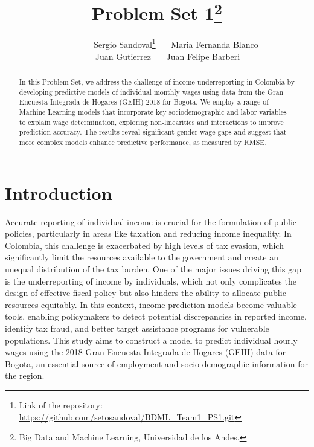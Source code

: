 \documentclass[11pt,a4paper,onecolumn]{article}
\begin{document}
\title{\huge Problem Set 1\thanks{Big Data and Machine Learning, Universidad de los Andes.}}

\author{\ \ \ \ \ \ \ \ \  Sergio Sandoval\thanks{Link of the repository: \href{https://github.com/setosandoval/BDML_Team1_PS1.git}{https://github.com/setosandoval/BDML\_Team1\_PS1.git}
} \ \ \ Maria Fernanda Blanco  

        \ \ \ \ \ Juan Gutierrez \ \ \ Juan Felipe Barberi}


\maketitle
\thispagestyle{empty} %

\begin{abstract}
In this Problem Set, we address the challenge of income underreporting in Colombia by developing predictive models of individual monthly wages using data from the Gran Encuesta Integrada de Hogares (GEIH) 2018 for Bogota. We employ a range of Machine Learning models that incorporate key sociodemographic and labor variables to explain wage determination, exploring non-linearities and interactions to improve prediction accuracy. The results reveal significant gender wage gaps and suggest that more complex models enhance predictive performance, as measured by RMSE.
\noindent %
\end{abstract}
\pagebreak



\section{Introduction} \label{sec:intro}

    Accurate reporting of individual income is crucial for the formulation of public policies, particularly in areas like taxation and reducing income inequality. In Colombia, this challenge is exacerbated by high levels of tax evasion, which significantly limit the resources available to the government and create an unequal distribution of the tax burden. One of the major issues driving this gap is the underreporting of income by individuals, which not only complicates the design of effective fiscal policy but also hinders the ability to allocate public resources equitably. In this context, income prediction models become valuable tools, enabling policymakers to detect potential discrepancies in reported income, identify tax fraud, and better target assistance programs for vulnerable populations. This study aims to construct a model to predict individual hourly wages using the 2018 Gran Encuesta Integrada de Hogares (GEIH) data for Bogota, an essential source of employment and socio-demographic information for the region.
    
\end{document}
